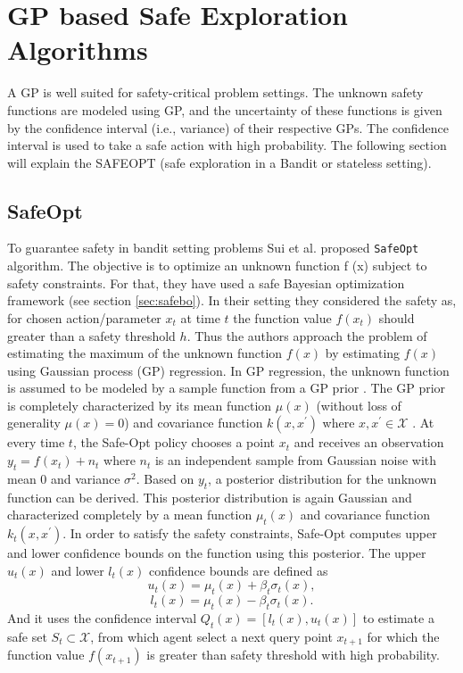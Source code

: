 \section{GP based Safe Exploration Algorithms}\label{sec:safe-explore}
A GP is well suited for safety-critical problem settings. The unknown safety functions are modeled using GP, and the uncertainty of these functions is given by the confidence interval (i.e., variance) of their respective GPs. The confidence interval is used to take a safe action with high probability. The following section will explain the SAFEOPT (safe exploration in a Bandit or stateless setting).

\subsection{SafeOpt}
To guarantee safety in bandit setting problems Sui et al.\cite{sui15} proposed \texttt{SafeOpt} algorithm. The objective is to optimize an unknown function f (x) subject to safety constraints.
For that, they have used a safe Bayesian optimization framework (see section \ref{sec:safebo}). 
In their setting they considered the safety as, for chosen action/parameter $x_t$ at time $t$ the function value $f(x_t)$ should greater than a safety threshold $h$. 
Thus the authors approach the problem of estimating the maximum of the unknown function $f(x)$ by estimating $f(x)$ using Gaussian process (GP) regression. 
In GP regression, the unknown function is assumed to be modeled by a sample function from a GP prior \cite{RasmussenW06}. 
The GP prior is completely characterized by its mean function $\mu(x)$ (without loss of generality $\mu(x) = 0$) and covariance function $k(x, x^\prime )$ where $x, x^\prime \in \mathcal{X}$ . 
At every time $t$, the Safe-Opt policy chooses a point $x_t$ and receives an observation $y_t = f (x_t) + n_t$ where $n_t$ is an independent sample from Gaussian noise with mean 0 and variance $\sigma^2$. 
Based on $y_t$, a posterior distribution for the unknown function can be derived. 
This posterior distribution is again Gaussian and characterized completely by a mean function $\mu_t(x)$ and covariance function $k_t (x, x^\prime)$. 
In order to satisfy the safety constraints, Safe-Opt computes upper and lower confidence bounds on the function using this posterior. The upper $u_t(x)$ and lower $l_t(x)$ confidence bounds are defined as 
$$u_t(x)=\mu_t(x)+\beta_t\sigma_t(x),$$
$$l_t(x)=\mu_t(x)-\beta_t\sigma_t(x).$$
And it uses the confidence interval $Q_t(x) = [l_t(x), u_t(x)]$ to estimate a safe set $S_t\subset \mathcal{X}$, from which agent select a next query point $x_{t+1}$ for which the function value $f(x_{t+1})$ is greater than safety threshold with high probability. 

